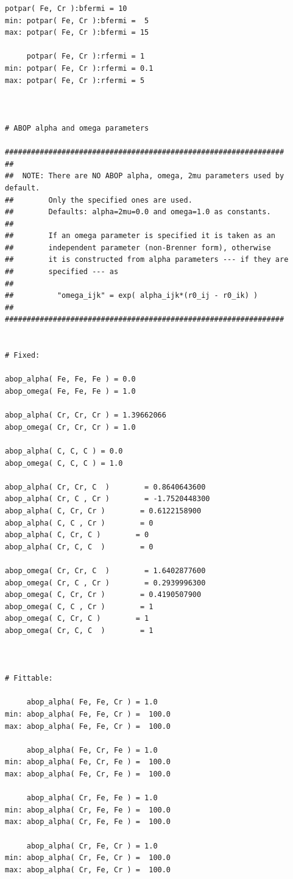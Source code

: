 \documentclass[a4paper,12pt,pdftex,onecolumn]{article}
\begin{document}
\begin{Verbatim}[fontsize=\relsize{-1},frame=single]
     potpar( Fe, Cr ):bfermi = 10
min: potpar( Fe, Cr ):bfermi =  5
max: potpar( Fe, Cr ):bfermi = 15

     potpar( Fe, Cr ):rfermi = 1
min: potpar( Fe, Cr ):rfermi = 0.1
max: potpar( Fe, Cr ):rfermi = 5



# ABOP alpha and omega parameters

################################################################
##
##  NOTE: There are NO ABOP alpha, omega, 2mu parameters used by default.
##        Only the specified ones are used.
##        Defaults: alpha=2mu=0.0 and omega=1.0 as constants.
##
##        If an omega parameter is specified it is taken as an
##        independent parameter (non-Brenner form), otherwise
##        it is constructed from alpha parameters --- if they are
##        specified --- as
##
##          "omega_ijk" = exp( alpha_ijk*(r0_ij - r0_ik) )
##
################################################################


# Fixed:

abop_alpha( Fe, Fe, Fe ) = 0.0
abop_omega( Fe, Fe, Fe ) = 1.0

abop_alpha( Cr, Cr, Cr ) = 1.39662066
abop_omega( Cr, Cr, Cr ) = 1.0

abop_alpha( C, C, C ) = 0.0
abop_omega( C, C, C ) = 1.0

abop_alpha( Cr, Cr, C  )        = 0.8640643600
abop_alpha( Cr, C , Cr )        = -1.7520448300
abop_alpha( C, Cr, Cr )        = 0.6122158900
abop_alpha( C, C , Cr )        = 0
abop_alpha( C, Cr, C )        = 0
abop_alpha( Cr, C, C  )        = 0

abop_omega( Cr, Cr, C  )        = 1.6402877600
abop_omega( Cr, C , Cr )        = 0.2939996300
abop_omega( C, Cr, Cr )        = 0.4190507900
abop_omega( C, C , Cr )        = 1
abop_omega( C, Cr, C )        = 1
abop_omega( Cr, C, C  )        = 1



# Fittable:

     abop_alpha( Fe, Fe, Cr ) = 1.0
min: abop_alpha( Fe, Fe, Cr ) =  100.0
max: abop_alpha( Fe, Fe, Cr ) =  100.0

     abop_alpha( Fe, Cr, Fe ) = 1.0
min: abop_alpha( Fe, Cr, Fe ) =  100.0
max: abop_alpha( Fe, Cr, Fe ) =  100.0

     abop_alpha( Cr, Fe, Fe ) = 1.0
min: abop_alpha( Cr, Fe, Fe ) =  100.0
max: abop_alpha( Cr, Fe, Fe ) =  100.0

     abop_alpha( Cr, Fe, Cr ) = 1.0
min: abop_alpha( Cr, Fe, Cr ) =  100.0
max: abop_alpha( Cr, Fe, Cr ) =  100.0


\end{Verbatim}
\end{document}

